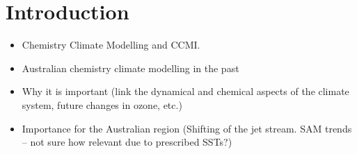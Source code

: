 \section{Introduction} 
\begin{itemize}
\item Chemistry Climate Modelling and CCMI.
\item Australian chemistry climate modelling in the past
\item Why it is important (link the dynamical and chemical aspects of the climate system, future changes in ozone, etc.)
\item Importance for the Australian region (Shifting of the jet stream. SAM trends – not sure how relevant due to prescribed SSTs?)
\end{itemize}
